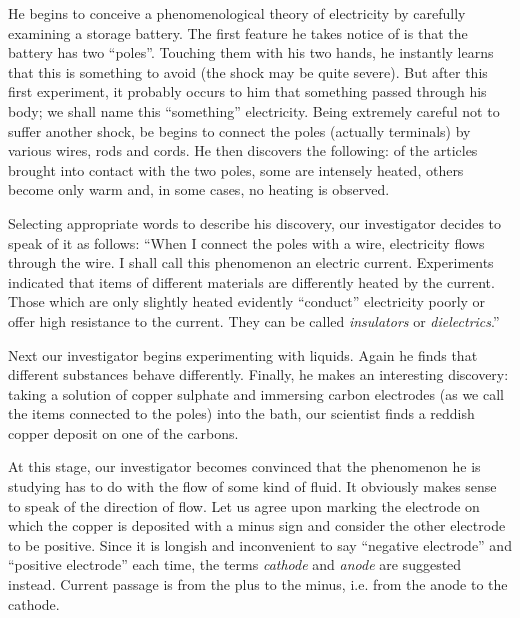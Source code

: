 He begins to conceive a phenomenological theory of
electricity by carefully examining a storage battery. The first feature he takes notice of is that the battery has two ``poles''. Touching them with his two hands, he instantly learns that this is something to avoid (the shock may be quite severe). But after this first experiment, it probably occurs to him that something passed through his body; we shall name this ``something'' electricity. Being extremely careful not to suffer another shock, be begins to connect the poles (actually terminals) by various wires, rods and cords. He then discovers the following: of the articles brought into contact with the two poles, some are intensely heated, others become only warm and, in some cases, no heating is observed. 

Selecting appropriate words to describe his discovery, our investigator decides to speak of it as follows: ``When I connect the poles with a wire, electricity flows through the wire. I shall call this phenomenon an electric current. Experiments indicated that items of different materials are differently heated by the current. Those which are only slightly heated evidently ``conduct'' electricity poorly or offer high resistance to the current. They can be called \emph{insulators} or \emph{dielectrics}.''

Next our investigator begins experimenting with liquids. Again he finds that different substances behave differently. Finally, he makes an interesting discovery: taking a solution of copper sulphate and immersing carbon electrodes (as we call the items connected to the poles) into the bath, our scientist finds a reddish copper deposit on one of the carbons.

At this stage, our investigator becomes convinced that the phenomenon he is studying has to do with the flow of some kind of fluid. It obviously makes sense to speak of the direction of flow. Let us agree upon marking the electrode on which the copper is deposited with a minus sign and consider the other electrode to be positive. Since it is longish and inconvenient to say ``negative electrode'' and ``positive electrode'' each time, the terms \emph{cathode} and \emph{anode} are suggested instead. Current passage is from the plus to the minus, i.e. from the anode to the cathode.

